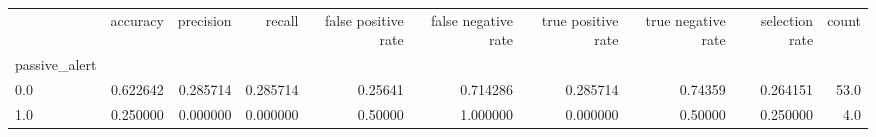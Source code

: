 \begin{tabular}{lrrrrrrrrr}
\toprule
{} &  accuracy &  precision &    recall &  false positive rate &  false negative rate &  true positive rate &  true negative rate &  selection rate &  count \\
passive\_alert &           &            &           &                      &                      &                     &                     &                 &        \\
\midrule
0.0           &  0.622642 &   0.285714 &  0.285714 &              0.25641 &             0.714286 &            0.285714 &             0.74359 &        0.264151 &   53.0 \\
1.0           &  0.250000 &   0.000000 &  0.000000 &              0.50000 &             1.000000 &            0.000000 &             0.50000 &        0.250000 &    4.0 \\
\bottomrule
\end{tabular}
